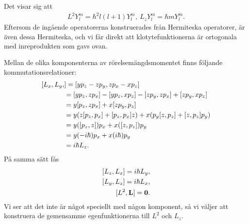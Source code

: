 Det visar sig att
\begin{align*}
	L^{2}Y_{l}^{m} = \hbar^{2}l(l + 1)Y_{l}^{m},\ L_{z}Y_{l}^{m} = \hbar mY_{l}^{m}.
\end{align*}
Eftersom de ingående operatorerna konstruerades från Hermiteska operatorer, är även dessa Hermiteska, och vi får direkt att klotytefunktionerna är ortogonala med inreprodukten som gavs ovan.

Mellan de olika komponenterna av rörelsemängdsmomentet finns följande kommutationsrelationer:
\begin{align*}
	\commut{L_{x}, L_{y}} &= \commut{yp_{z} - zp_{y}}{zp_{x} - xp_{z}} \\
	                      &= \commut{yp_{z}}{zp_{x}} - \commut{yp_{z}}{xp_{z}} - \commut{zp_{y}}{zp_{x}} + \commut{zp_{y}}{xp_{z}} \\
	                      &= y\commut{p_{z}}{zp_{x}} + x\commut{zp_{y}}{p_{z}} \\
	                      &= y(z\commut{p_{z}}{p_{x}} + \commut{p_{z}}{p_{x}}z) + x(p_{y}\commut{z}{p_{z}} + \commut{z}{p_{z}}p_{y}) \\
	                      &= y(\commut{p_{z}}{z})p_{x} + x(\commut{z}{p_{z}})p_{y} \\
	                      &= y(-i\hbar)p_{x} + x(i\hbar)p_{y} \\
	                      &= i\hbar L_{z}.
\end{align*}
På samma sätt fås
\begin{align*}
	\commut{L_{z}}{L_{x}} = i\hbar L_{y}, \\
	\commut{L_{y}}{L_{z}} = i\hbar L_{x}, \\
	\commut{L^{2}}{\vb{L}} = \vb{0}.
\end{align*}
Vi ser att det inte är något speciellt med någon komponent, så vi väljer att konstruera de gemensamme egenfunktionerna till $L^{2}$ och $L_{z}$.

